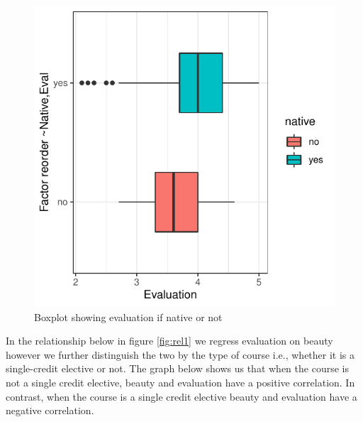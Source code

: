 \documentclass[
  12 pt,
]{article}
\begin{document}
\begin{figure}[H]

{\centering \includegraphics{18205420_Markdown--1-_files/figure-latex/boxplot-1} 

}

\caption{Boxplot showing evaluation if native or not}\label{fig:boxplot}
\end{figure}

\newpage

In the relationship below in figure \ref{fig:rel1} we regress evaluation on beauty however we further distinguish the two by the type of course i.e., whether it is a single-credit elective or not. The graph below shows us that when the course is not a single credit elective, beauty and evaluation have a positive correlation. In contrast, when the course is a single credit elective beauty and evaluation have a negative correlation.
\end{document}
